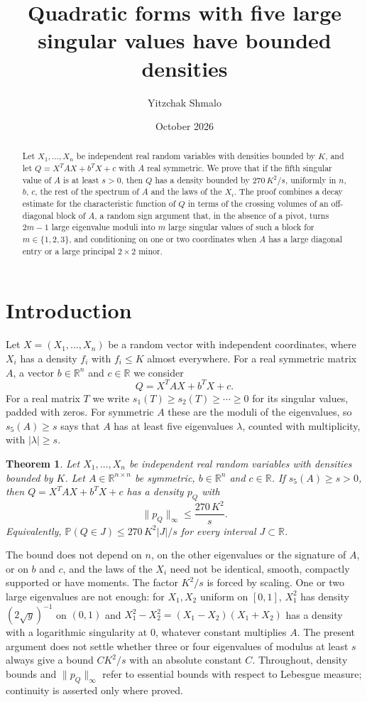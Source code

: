\documentclass[11pt]{amsart}
\title{Quadratic forms with five large singular values have bounded densities}
\author{Yitzchak Shmalo}
\date{October 2026}
\numberwithin{equation}{section}
\newtheorem{theorem}{Theorem}[section]
\theoremstyle{definition}
\theoremstyle{remark}
\newcommand{\R}{\mathbb R}
\newcommand{\PP}{\mathbb P}
\newcommand{\1}{\mathbf 1}
\newcommand{\norm}[1]{\lVert #1\rVert}
\newcommand{\abs}[1]{\lvert #1\rvert}
\begin{document}
\begin{abstract}
Let $X_1,\dots,X_n$ be independent real random variables with densities bounded by $K$, and let $Q=X^{T}AX+b^{T}X+c$ with $A$ real symmetric. We prove that if the fifth singular value of $A$ is at least $s>0$, then $Q$ has a density bounded by $270\,K^2/s$, uniformly in $n$, $b$, $c$, the rest of the spectrum of $A$ and the laws of the $X_i$. The proof combines a decay estimate for the characteristic function of $Q$ in terms of the crossing volumes of an off-diagonal block of $A$, a random sign argument that, in the absence of a pivot, turns $2m-1$ large eigenvalue moduli into $m$ large singular values of such a block for $m\in\{1,2,3\}$, and conditioning on one or two coordinates when $A$ has a large diagonal entry or a large principal $2\times2$ minor.
\end{abstract}

\maketitle

\section{Introduction}\label{sec:intro}

Let $X=(X_1,\dots,X_n)$ be a random vector with independent coordinates, where $X_i$ has a density $f_i$ with $f_i\le K$ almost everywhere. For a real symmetric matrix $A$, a vector $b\in\R^n$ and $c\in\R$ we consider
\[
Q=X^{T}AX+b^{T}X+c .
\]
For a real matrix $T$ we write $s_1(T)\ge s_2(T)\ge\cdots\ge0$ for its singular values, padded with zeros. For symmetric $A$ these are the moduli of the eigenvalues, so $s_5(A)\ge s$ says that $A$ has at least five eigenvalues $\lambda$, counted with multiplicity, with $\abs\lambda\ge s$.

\begin{theorem}\label{thm:main}
Let $X_1,\dots,X_n$ be independent real random variables with densities bounded by $K$. Let $A\in\R^{n\times n}$ be symmetric, $b\in\R^n$ and $c\in\R$. If $s_5(A)\ge s>0$, then $Q=X^TAX+b^TX+c$ has a density $p_Q$ with
\[
\norm{p_Q}_\infty\le \frac{270\,K^2}{s}.
\]
Equivalently, $\PP(Q\in J)\le 270\,K^2\abs J/s$ for every interval $J\subset\R$.
\end{theorem}

The bound does not depend on $n$, on the other eigenvalues or the signature of $A$, or on $b$ and $c$, and the laws of the $X_i$ need not be identical, smooth, compactly supported or have moments. The factor $K^2/s$ is forced by scaling. One or two large eigenvalues are not enough: for $X_1,X_2$ uniform on $[0,1]$, $X_1^2$ has density $(2\sqrt y)^{-1}$ on $(0,1)$ and $X_1^2-X_2^2=(X_1-X_2)(X_1+X_2)$ has a density with a logarithmic singularity at $0$, whatever constant multiplies $A$. The present argument does not settle whether three or four eigenvalues of modulus at least $s$ always give a bound $CK^2/s$ with an absolute constant $C$. Throughout, density bounds and $\norm{p_Q}_\infty$ refer to essential bounds with respect to Lebesgue measure; continuity is asserted only where proved.
\end{document}
